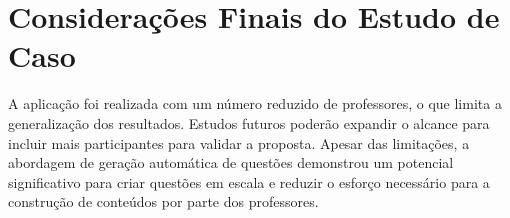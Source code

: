 \section{Considerações Finais do Estudo de Caso}
A aplicação foi realizada com um número reduzido de professores, o que limita a generalização dos resultados. Estudos futuros poderão expandir o alcance para incluir mais participantes para validar a proposta. Apesar das limitações, a abordagem de geração automática de questões demonstrou um potencial significativo para criar questões em escala e reduzir o esforço necessário para a construção de conteúdos por parte dos professores.


